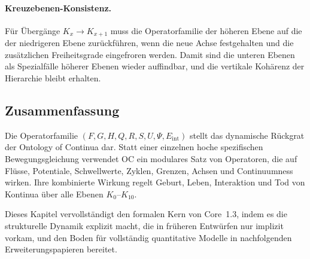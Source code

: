 \paragraph{Kreuzebenen-Konsistenz.}
Für Übergänge \(K_x \to K_{x+1}\) muss die Operatorfamilie der höheren Ebene auf
die der niedrigeren Ebene zurückführen, wenn die neue Achse festgehalten und die
zusätzlichen Freiheitsgrade eingefroren werden. Damit sind die unteren Ebenen
als Spezialfälle höherer Ebenen wieder auffindbar, und die vertikale
Kohärenz der Hierarchie bleibt erhalten.

\subsection{Zusammenfassung}

Die Operatorfamilie \((F, G, H, Q, R, S, U, \Psi, E_{\mathrm{int}})\) stellt
das dynamische Rückgrat der Ontology of Continua dar. Statt einer einzelnen
hoche spezifischen Bewegungsgleichung verwendet OC ein modulares Satz von
Operatoren, die auf Flüsse, Potentiale, Schwellwerte, Zyklen, Grenzen, Achsen
und Continuumness wirken. Ihre kombinierte Wirkung regelt Geburt, Leben,
Interaktion und Tod von Kontinua über alle Ebenen \(K_0\)–\(K_{10}\).

Dieses Kapitel vervollständigt den formalen Kern von Core~1.3, indem es die
strukturelle Dynamik explizit macht, die in früheren Entwürfen nur implizit
vorkam, und den Boden für vollständig quantitative Modelle in nachfolgenden
Erweiterungspapieren bereitet.


